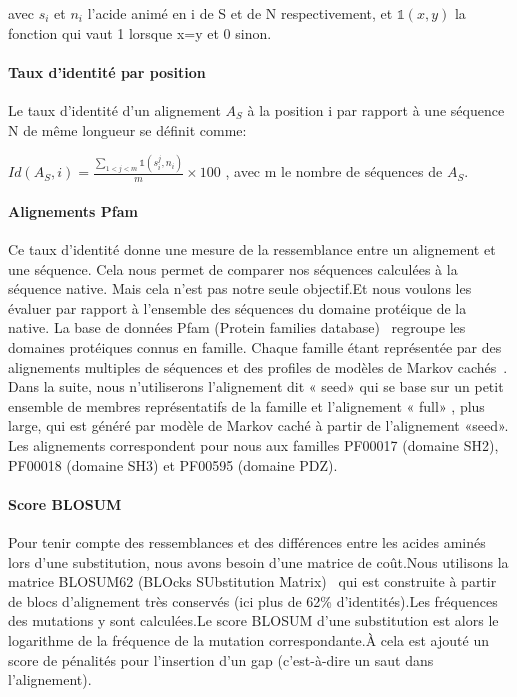 avec $s_i$ et $n_i$ l'acide animé en i de S et de N respectivement, et $\mathds{1}(x,y)$ la fonction qui vaut 1 lorsque x=y et 0 sinon. 

\paragraph{Taux d'identité par position}

Le taux d'identité d'un alignement $A_S$ à la position i par rapport à une séquence N de même longueur se définit comme:

$Id(A_{S},i) = \frac{\sum_{1<j<m} \mathds{1}(s_i^j,n_i)}{m} \times 100$ , avec m le nombre de séquences de $A_S$.

\paragraph{Alignements Pfam} 
Ce taux d'identité donne une mesure de la ressemblance entre un alignement et une séquence. Cela nous permet de comparer nos séquences calculées à la séquence native. Mais cela n'est pas notre seule objectif.Et nous voulons les évaluer par rapport à l'ensemble des séquences du domaine protéique de la native.  
La base de données Pfam (Protein families database)~\citep{refPfam} regroupe les domaines protéiques connus en famille. Chaque famille étant représentée par des alignements multiples de séquences et des profiles de modèles de Markov cachés~\citep{refPfam}. Dans la suite, nous n'utiliserons l'alignement dit « seed» qui se base sur un petit ensemble de membres représentatifs de la famille et l'alignement « full» , plus large, qui est généré par modèle de Markov caché à partir de l'alignement «seed». Les alignements correspondent pour nous aux familles PF00017 (domaine SH2), PF00018  (domaine SH3) et PF00595 (domaine PDZ).

\paragraph{Score BLOSUM}

Pour tenir compte des ressemblances et des différences entre les acides aminés lors d'une substitution, nous avons besoin d'une matrice de coût.Nous utilisons la matrice BLOSUM62 (BLOcks SUbstitution Matrix)~\citep{refBLOSUM} qui est construite à partir de blocs d'alignement très conservés (ici plus de 62\% d'identités).Les fréquences des mutations y sont calculées.Le score BLOSUM d'une substitution est alors le logarithme de la fréquence de la mutation correspondante.À cela est ajouté un score de pénalités pour l'insertion d'un gap (c'est-à-dire un saut dans l'alignement).

